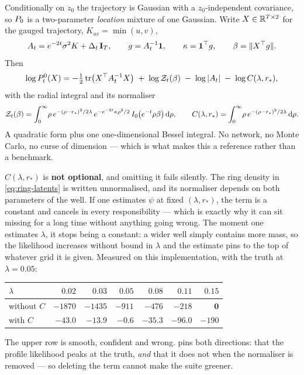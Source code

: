 Conditionally on $z_0$ the trajectory is Gaussian with a $z_0$-independent covariance, so $P_0$
is a two-parameter \emph{location} mixture of one Gaussian. Write $X\in\mathbb{R}^{T\times2}$ for the
gauged trajectory, $K_{uv} = \min(u,v)$,
\[
A_t = e^{-2t}\sigma^2 K + \Delta_t\,\mathbf{I}_T,
\qquad
g = A_t^{-1}\mathbf{1},
\qquad
\kappa = \mathbf{1}^\top g,
\qquad
\beta = \|X^\top g\| .
\]
Then
\begin{equation}
\label{eq:ring-density}
\log P_t^0(X) = -\tfrac12\,\mathrm{tr}\!\left(X^\top A_t^{-1} X\right)
\;+\; \log \mathcal{Z}_t(\beta) \;-\; \log|A_t| \;-\; \log C(\lambda, r_*),
\end{equation}
with the radial integral and its normaliser
\begin{equation}
\label{eq:ring-Z}
\mathcal{Z}_t(\beta) = \int_0^\infty\! \rho\, e^{-(\rho-r_*)^2/2\lambda}\,
e^{-e^{-2t}\kappa\rho^2/2}\, I_0\!\left(e^{-t}\rho\beta\right)\mathrm{d}\rho,
\qquad
C(\lambda,r_*) = \int_0^\infty\! \rho\, e^{-(\rho-r_*)^2/2\lambda}\,\mathrm{d}\rho .
\end{equation}
A quadratic form plus one one-dimensional Bessel integral. No network, no Monte Carlo, no curse
of dimension --- which is what makes this a reference rather than a benchmark.

\begin{pitfall}
$C(\lambda,r_*)$ is \textbf{not optional}, and omitting it fails silently. The ring density in
\eqref{eq:ring-latents} is written unnormalised, and its normaliser depends on both parameters
of the well. If one estimates $\psi$ at fixed $(\lambda,r_*)$, the term is a constant and
cancels in every responsibility --- which is exactly why it can sit missing for a long time
without anything going wrong. The moment one estimates $\lambda$, it stops being a constant: a
wider well simply contains more mass, so the likelihood increases without bound in $\lambda$ and
the estimate pins to the top of whatever grid it is given. Measured on this implementation, with
the truth at $\lambda=0.05$:

\begin{center}\small
\begin{tabular}{@{}lrrrrrr@{}}
\toprule
$\lambda$ & $0.02$ & $0.03$ & $0.05$ & $0.08$ & $0.11$ & $0.15$ \\
\midrule
without $C$ & $-1870$ & $-1435$ & $-911$ & $-476$ & $-218$ & $\mathbf{0}$ \\
with $C$ & $-43.0$ & $-13.9$ & $\mathbf{-0.6}$ & $-35.3$ & $-96.0$ & $-190$ \\
\bottomrule
\end{tabular}
\end{center}

\noindent
The upper row is smooth, confident and wrong.  pins both
directions: that the profile likelihood peaks at the truth, \emph{and} that it does not when the
normaliser is removed --- so deleting the term cannot make the suite greener.
\end{pitfall}

